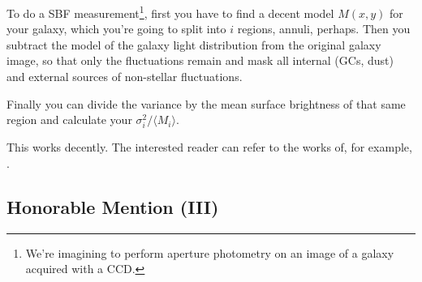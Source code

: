 \par To do a SBF measurement\footnote{We're imagining to perform aperture photometry on an image of a galaxy acquired with a CCD.}, first you have to find a decent model $M(x,y)$ for your galaxy, which you're going to split into $i$ regions, annuli, perhaps. Then you subtract the model of the galaxy light distribution from the original galaxy image, so that only the fluctuations remain and mask all internal (GCs, dust) and external sources of non-stellar fluctuations.
\par Finally you can divide the variance by the mean surface brightness of that same region and calculate your $\sigma_{i}^{2}/\langle M_{i}\rangle$.
\par This works decently. The interested reader can refer to the works of, for example, \cite{Blakeslee_2021}.

\subsection*{Honorable Mention (III)}

